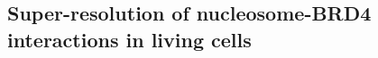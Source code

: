 \documentclass{ucetd}
\begin{document}

\subsection{Super-resolution of nucleosome-BRD4 interactions in living cells}
\end{document}
